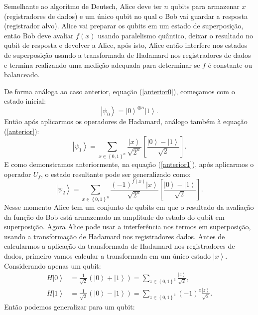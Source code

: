 Semelhante ao algoritmo de Deutsch, Alice deve ter $n$ qubits para armazenar $x$ (registradores de dados) e um único qubit no qual o Bob vai guardar a resposta (registrador alvo). Alice vai preparar os qubits em um estado de superposição, então Bob deve avaliar $f\left(x\right)$ usando paralelismo quântico, deixar o resultado no qubit de resposta e devolver a Alice, após isto, Alice então interfere nos estados de superposição usando a transformada de Hadamard nos registradores de dados e termina realizando uma medição adequada para determinar se $f$ é constante ou balanceado.

De forma análoga ao caso anterior, equação (\ref{anterior0}), começamos com o estado inicial:
\begin{equation}
\left|\psi_{0}\right\rangle =\left|0\right\rangle ^{\otimes n}\left|1\right\rangle 
. \end{equation}
Então após aplicarmos os operadores de Hadamard, análogo também à equação (\ref{anterior}):
\begin{equation}
\left|\psi_{1}\right\rangle =\sum_{x\in\left\{ 0,1\right\} ^{n}}\frac{\left|x\right\rangle }{\sqrt{2^{n}}}\left[\frac{\left|0\right\rangle -\left|1\right\rangle }{\sqrt{2}}\right]
. \end{equation}E como demonstramos anteriormente, na equação (\ref{anterior1}), após aplicarmos o operador $U_{f}$, o estado resultante pode ser generalizado como:
\begin{equation}
\left|\psi_{2}\right\rangle =\sum_{x\in\left\{ 0,1\right\} ^{n}}\frac{\left(-1\right)^{f\left(x\right)}\left|x\right\rangle }{\sqrt{2^{n}}}\left[\frac{\left|0\right\rangle -\left|1\right\rangle }{\sqrt{2}}\right]
. \end{equation}
Nesse momento Alice tem um conjunto de qubits em que o resultado da avaliação da função do Bob está armazenado na amplitude do estado do qubit em superposição. Agora Alice pode usar a interferência nos termos em superposição, usando a transformação de Hadamard nos registradores dados. Antes de calcularmos a aplicação da transformada de Hadamard nos registradores de dados, primeiro vamos calcular a transformada em um único estado $\left|x\right\rangle $.  Considerando apenas um qubit:
\begin{equation}
\begin{split}
H\left|0\right\rangle & =\frac{1}{\sqrt{2}}\left(\left|0\right\rangle +\left|1\right\rangle \right)=\sum_{z\in\left\{ 0,1\right\} ^{1}} \frac{\left|z\right\rangle }{\sqrt{2}},\\
H\left|1\right\rangle & =\frac{1}{\sqrt{2}}\left(\left|0\right\rangle -\left|1\right\rangle \right)=\sum_{z\in\left\{ 0,1\right\} ^{1}} \left(-1\right)^{z}\frac{\left|z\right\rangle }{\sqrt{2}}.
\end{split}
\end{equation}Então podemos generalizar para um qubit:
